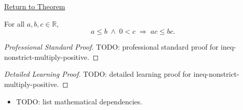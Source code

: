 \newpage
{}
\label{prf:ineq-nonstrict-multiply-positive}

\begin{remark*}[Return]
\hyperref[thm:ineq-nonstrict-multiply-positive]{Return to Theorem}
\end{remark*}

\begin{theorem*}
For all $a, b, c \in \mathbb{R}$,
\[
  a \le b \;\land\; 0 < c \;\Rightarrow\; ac \le bc.
\]
\end{theorem*}

\begin{proof}[Professional Standard Proof]
\LRAProofBodyStart
TODO: professional standard proof for ineq-nonstrict-multiply-positive.
\end{proof}

\begin{proof}[Detailed Learning Proof]
\LRAProofBodyStart
TODO: detailed learning proof for ineq-nonstrict-multiply-positive.
\end{proof}

\begin{remark*}
\end{remark*}

\begin{dependencies}
\begin{itemize}
  \item TODO: list mathematical dependencies.
\end{itemize}
\end{dependencies}

\clearpage

